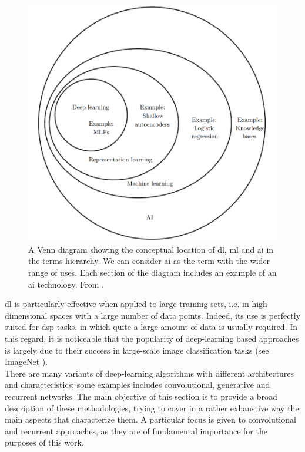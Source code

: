 \begin{figure}[H]
	\begin{center}
		\includegraphics[scale=.7]{img/ai.png}
		\captionsetup{margin=2cm}
		\caption{A Venn diagram showing the conceptual location of \gls{dl},  \gls{ml} and \gls{ai} in the terms hierarchy. We can consider \gls{ai} as the term with the wider range of uses. Each section of the diagram includes an example of an \gls{ai} technology. From \cite{goodfellow2016deep}.}
		\label{fig:ai}
	\end{center}
\end{figure}
\noindent \gls{dl} is particularly effective when applied to large training sets, i.e. in high dimensional spaces with a large number of data points. Indeed, its use is perfectly suited for \gls{dsp} tasks, in which quite
a large amount of data is usually required. In this regard, it is noticeable that the popularity of deep-learning based approaches is largely due to their success in large-scale image classification tasks (see ImageNet \cite{ILSVRC15}). \\
There are many variants of deep-learning algorithms with different architectures and characteristics; some examples includes convolutional, generative and recurrent networks. The main objective of this section is to provide a broad description of these methodologies, trying to cover in a rather exhaustive way the main aspects that characterize them. A particular focus is given to convolutional and recurrent approaches, as they are of fundamental importance for the purposes of this work.

